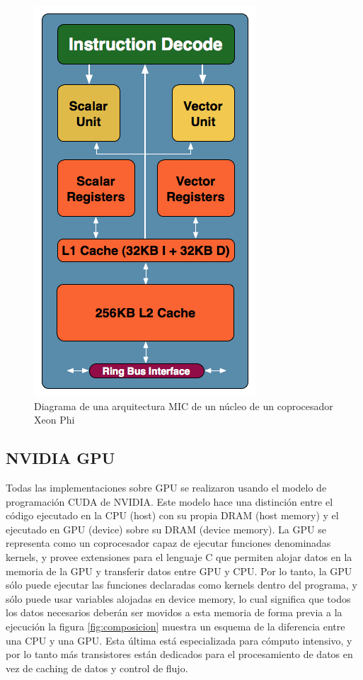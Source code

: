 \begin{figure}[hbtp]
\centering
\label{estructuraxeon2}
\includegraphics[scale=0.5]{fig/core.png}
\caption{Diagrama de una arquitectura MIC de un núcleo de un coprocesador Xeon Phi}
\end{figure}

\subsection{NVIDIA GPU}\label{cap:cuda}

Todas las implementaciones sobre GPU se realizaron usando el modelo de programación CUDA \cite{cuda} de NVIDIA. Este modelo hace una distinción entre el código ejecutado en la CPU (host) con su propia DRAM (host memory) y el ejecutado en GPU (device) sobre su DRAM (device memory). La GPU se representa como un coprocesador capaz de ejecutar funciones denominadas kernels, y provee extensiones para el lenguaje C que permiten alojar datos en la memoria de la GPU y transferir datos entre GPU y CPU. Por lo tanto, la GPU sólo puede ejecutar las funciones declaradas como kernels dentro del programa, y sólo puede usar variables alojadas en device memory, lo cual significa que todos los datos necesarios deberán ser movidos a esta memoria de forma previa a la ejecución la figura \ref{fig:composicion} muestra un esquema de la diferencia entre una CPU y una GPU. Esta última está especializada para cómputo intensivo, y por lo tanto más transistores están dedicados para el procesamiento de datos en vez de caching de datos y control de flujo. 

